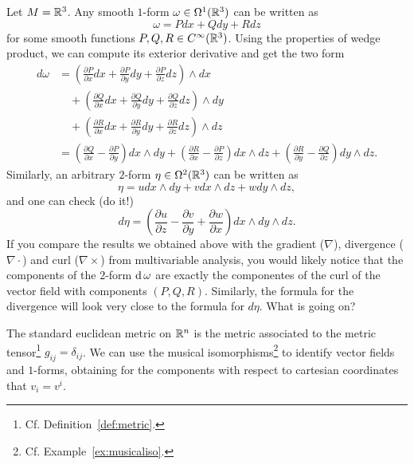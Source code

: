 \begin{example}
  Let $M=\mathbb{R}^3$. Any smooth $1$-form $\omega\in\Omega^1(\mathbb{R}^3)$ can be written as
  \begin{equation}
    \omega = P dx + Q dy + R dz
  \end{equation}
  for some smooth functions $P,Q,R\in C^\infty(\mathbb{R}^3)$.
  Using the properties of wedge product, we can compute its exterior derivative and get the two form
  \begin{align}
    d\omega &= \left(\frac{\partial P}{\partial x} dx + \frac{\partial P}{\partial y} dy + \frac{\partial P}{\partial z} dz \right) \wedge dx \\
            &\quad+\left(\frac{\partial Q}{\partial x} dx + \frac{\partial Q}{\partial y} dy + \frac{\partial Q}{\partial z} dz \right) \wedge dy \\
            &\quad+\left(\frac{\partial R}{\partial x} dx + \frac{\partial R}{\partial y} dy + \frac{\partial R}{\partial z} dz \right) \wedge dz \\
            &= \left(\frac{\partial Q}{\partial x} - \frac{\partial P}{\partial y}\right) dx \wedge dy + 
            \left(\frac{\partial R}{\partial x} - \frac{\partial P}{\partial z}\right) dx \wedge dz + \left(\frac{\partial R}{\partial y} - \frac{\partial Q}{\partial z}\right) dy \wedge dz.
  \end{align}
  Similarly, an arbitrary $2$-form $\eta\in\Omega^2(\mathbb{R}^3)$ can be written as
  \begin{equation}
    \eta = u dx\wedge dy + v dx\wedge dz + w dy\wedge dz,
  \end{equation}
  and one can check (do it!)
  \begin{equation}
    d\eta = \left(\frac{\partial u}{\partial z}-\frac{\partial v}{\partial y} + \frac{\partial w}{\partial x}\right) dx\wedge dy \wedge dz.
  \end{equation}
  If you compare the results we obtained above with the gradient ($\nabla$), divergence ($\nabla\cdot$) and curl ($\nabla\times$) from multivariable analysis, you would likely notice that the components of the $2$-form $\operatorname{d}\omega$ are exactly the componentes of the curl of the vector field with components $(P, Q, R)$.
  Similarly, the formula for the divergence will look very close to the formula for $d\eta$. 
  What is going on?

  The standard euclidean metric on $\mathbb{R}^n$ is the metric associated to the metric tensor\footnote{Cf. Definition~\ref{def:metric}.} $g_{ij} = \delta_{ij}$.
  We can use the musical isomorphisms\footnote{Cf. Example~\ref{ex:musicaliso}.} to identify vector fields and $1$-forms, obtaining for the components with respect to cartesian coordinates that $v_i = v^i$.


\end{example}
